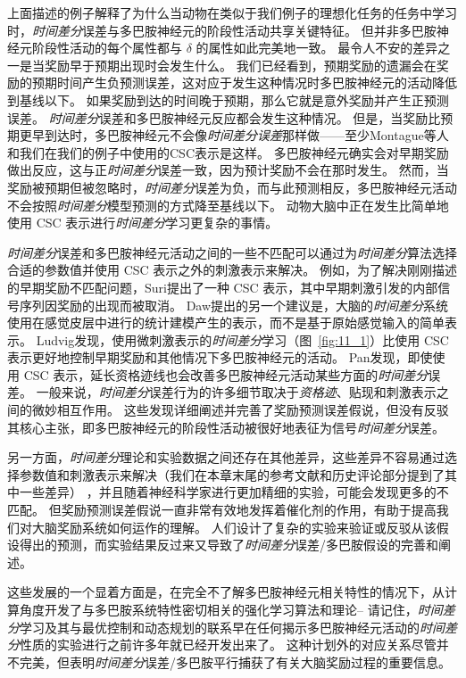 上面描述的例子解释了为什么当动物在类似于我们例子的理想化任务的任务中学习时，\textit{时间差分}误差与多巴胺神经元的阶段性活动共享关键特征。
但并非多巴胺神经元阶段性活动的每个属性都与 $\delta$ 的属性如此完美地一致。
最令人不安的差异之一是当奖励早于预期出现时会发生什么。
我们已经看到，预期奖励的遗漏会在奖励的预期时间产生负预测误差，这对应于发生这种情况时多巴胺神经元的活动降低到基线以下。
如果奖励到达的时间晚于预期，那么它就是意外奖励并产生正预测误差。
\textit{时间差分}误差和多巴胺神经元反应都会发生这种情况。
但是，当奖励比预期更早到达时，多巴胺神经元不会像\textit{时间差分误差}那样做——至少Montague等人\cite{montague1996framework}和我们在我们的例子中使用的CSC表示是这样。
多巴胺神经元确实会对早期奖励做出反应，这与正\textit{时间差分}误差一致，因为预计奖励不会在那时发生。
然而，当奖励被预期但被忽略时，\textit{时间差分}误差为负，而与此预测相反，多巴胺神经元活动不会按照\textit{时间差分}模型预测的方式降至基线以下\cite{hollerman1998dopamine}。
动物大脑中正在发生比简单地使用 CSC 表示进行\textit{时间差分}学习更复杂的事情。



\textit{时间差分}误差和多巴胺神经元活动之间的一些不匹配可以通过为\textit{时间差分}算法选择合适的参数值并使用 CSC 表示之外的刺激表示来解决。
例如，为了解决刚刚描述的早期奖励不匹配问题，Suri\cite{suri1999neural}提出了一种 CSC 表示，其中早期刺激引发的内部信号序列因奖励的出现而被取消。
Daw\cite{daw2006representation}提出的另一个建议是，大脑的\textit{时间差分}系统使用在感觉皮层中进行的统计建模产生的表示，而不是基于原始感觉输入的简单表示。
Ludvig\cite{ludvig2008stimulus}发现，使用微刺激表示的\textit{时间差分}学习（图~\ref{fig:11_1}）比使用 CSC 表示更好地控制早期奖励和其他情况下多巴胺神经元的活动。
Pan\cite{pan2005dopamine}发现，即使使用 CSC 表示，延长资格迹线也会改善多巴胺神经元活动某些方面的\textit{时间差分}误差。
一般来说，\textit{时间差分}误差行为的许多细节取决于\textit{资格迹}、贴现和刺激表示之间的微妙相互作用。
这些发现详细阐述并完善了奖励预测误差假说，但没有反驳其核心主张，即多巴胺神经元的阶段性活动被很好地表征为信号\textit{时间差分}误差。


另一方面，\textit{时间差分}理论和实验数据之间还存在其他差异，这些差异不容易通过选择参数值和刺激表示来解决（我们在本章末尾的参考文献和历史评论部分提到了其中一些差异） ，并且随着神经科学家进行更加精细的实验，可能会发现更多的不匹配。
但奖励预测误差假说一直非常有效地发挥着催化剂的作用，有助于提高我们对大脑奖励系统如何运作的理解。
人们设计了复杂的实验来验证或反驳从该假设得出的预测，而实验结果反过来又导致了\textit{时间差分}误差/多巴胺假设的完善和阐述。


这些发展的一个显着方面是，在完全不了解多巴胺神经元相关特性的情况下，从计算角度开发了与多巴胺系统特性密切相关的强化学习算法和理论-- 请记住，\textit{时间差分}学习及其与最优控制和动态规划的联系早在任何揭示多巴胺神经元活动的\textit{时间差分}性质的实验进行之前许多年就已经开发出来了。
这种计划外的对应关系尽管并不完美，但表明\textit{时间差分}误差/多巴胺平行捕获了有关大脑奖励过程的重要信息。


